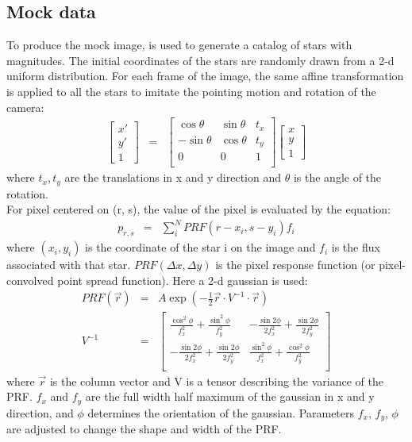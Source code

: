 \subsection{Mock data}
To produce the mock image,  \citep{TRILEGAL}  is used to generate a catalog of stars with magnitudes. 
The initial coordinates of the stars are randomly drawn from a 2-d uniform distribution. 
For each frame of the image, the same affine transformation is applied  to all the stars to imitate the pointing motion and rotation of the camera:
\begin{eqnarray}\label{transformation}
\begin{bmatrix}
    x' \\
    y' \\
    1
\end{bmatrix}
&=&
\begin{bmatrix}
    \cos \theta & \sin \theta & t_x \\
    -\sin \theta & \cos \theta & t_y \\
    0 & 0 & 1 \\
\end{bmatrix}
\begin{bmatrix}
    x \\
    y \\
    1
\end{bmatrix}
\end{eqnarray}
where $t_x, t_y$ are the translations in x and y direction and $\theta$ is the angle of the rotation.\\
For pixel centered on (r, s), the value of the pixel is evaluated by the equation:
\begin{eqnarray}
p_{r,s} &=& \sum_{i}^{N} PRF(r-x_i, s-y_i) f_i
\end{eqnarray}
where $(x_i,y_i)$ is the coordinate of the star i on the image and $f_i$ is the flux associated with that star. 
$PRF(\Delta x, \Delta y)$ is the pixel response function (or pixel-convolved point spread function). 
Here a 2-d gaussian is used:
\begin{eqnarray} \label{prf}
PRF(\vec{r}) &=& A \exp(-\frac{1}{2} \vec{r}\cdot V^{-1}\cdot \vec{r}) \\
V^{-1} &=& 
\begin{bmatrix}
    \frac {\cos ^{2}\phi }{f_{x}^{2}}+\frac {\sin ^{2}\phi }{f_{y}^{2}} & -\frac {\sin 2\phi }{2f_{x}^{2}}+\frac {\sin 2\phi }{2f_{y}^{2}}  \\
    -\frac {\sin 2\phi }{2f_{x}^{2}}+\frac {\sin 2\phi }{2f_{y}^{2}} & \frac {\sin ^{2}\phi }{f_{x}^{2}}+\frac {\cos ^{2}\phi }{f_{y}^{2}} \\
\end{bmatrix}
\end{eqnarray}
where $\vec{r}$ is the column vector and V is a tensor describing the variance of the PRF.
$f_x$ and $f_y$ are the full width half maximum of the gaussian in x and y direction, and $\phi$ determines the orientation of the gaussian.
Parameters $f_x$, $f_y$, $\phi$ are adjusted to change the shape and width of the PRF.

